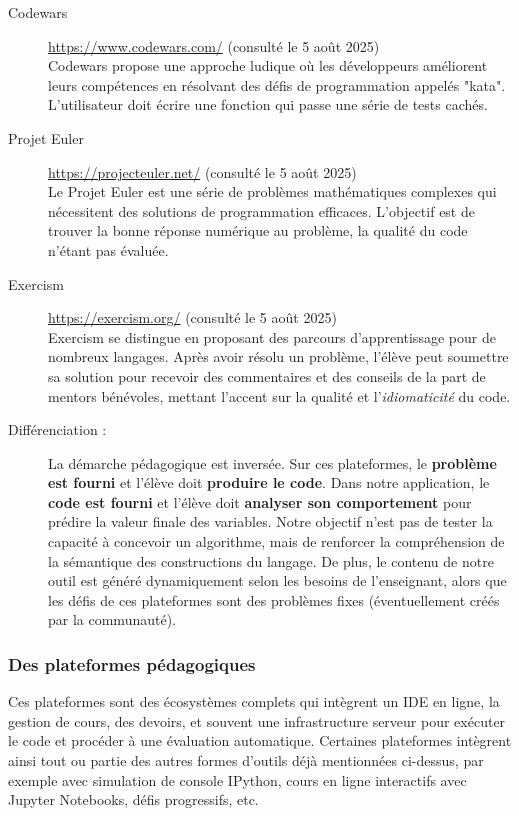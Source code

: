 \documentclass[11pt,a4paper]{article}
\begin{document}
\begin{description}
    \item[Codewars] \url{https://www.codewars.com/} (consulté le 5 août 2025) \\
    Codewars propose une approche ludique où les développeurs améliorent leurs compétences en résolvant des défis de programmation appelés "kata". L'utilisateur doit écrire une fonction qui passe une série de tests cachés.

    \item[Projet Euler] \url{https://projecteuler.net/} (consulté le 5 août 2025) \\
    Le Projet Euler est une série de problèmes mathématiques complexes qui nécessitent des solutions de programmation efficaces. L'objectif est de trouver la bonne réponse numérique au problème, la qualité du code n'étant pas évaluée.

    \item[Exercism] \url{https://exercism.org/} (consulté le 5 août 2025) \\
    Exercism se distingue en proposant des parcours d'apprentissage pour de nombreux langages. Après avoir résolu un problème, l'élève peut soumettre sa solution pour recevoir des commentaires et des conseils de la part de mentors bénévoles, mettant l'accent sur la qualité et l'\textit{idiomaticité} du code.
    
    \item[Différenciation :] La démarche pédagogique est inversée. Sur ces plateformes, le \textbf{problème est fourni} et l'élève doit \textbf{produire le code}. Dans notre application, le \textbf{code est fourni} et l'élève doit \textbf{analyser son comportement} pour prédire la valeur finale des variables. Notre objectif n'est pas de tester la capacité à concevoir un algorithme, mais de renforcer la compréhension de la sémantique des constructions du langage. De plus, le contenu de notre outil est généré dynamiquement selon les besoins de l'enseignant, alors que les défis de ces plateformes sont des problèmes fixes (éventuellement créés par la communauté).
\end{description}

\subsubsection*{Des plateformes pédagogiques}
Ces plateformes sont des écosystèmes complets qui intègrent un IDE en ligne, la gestion de cours, des devoirs, et souvent une infrastructure serveur pour exécuter le code et procéder à une évaluation automatique. Certaines plateformes intègrent ainsi tout ou partie des autres formes d'outils déjà mentionnées ci-dessus, par exemple avec simulation de console IPython, cours en ligne interactifs avec Jupyter Notebooks, défis progressifs, etc.
\end{document}
